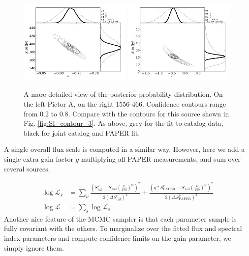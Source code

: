 \documentclass[preprint]{aastex}
\newcommand{\PAPER}{\mathrm{PAPER}}
\begin{document}
\begin{figure}[htbp]
\includegraphics[width=0.49\textwidth]{plots/pic_trace_hist.png}
\includegraphics[width=0.49\textwidth]{plots/1556-466_trace_hist.png}
\caption{
A more detailed view of the posterior probability distribution. On the left
Pictor A, on the right 1556-466. Confidence contours range from 0.2 to 0.8.
Compare with the contours for this source shown in Fig. \ref{fig:SI_contour_3}.
As above, grey for  the fit to catalog data, black for joint catalog and PAPER
fit.
}
\end{figure}


A single overall flux scale is computed in a similar way. However, here we add
a single extra gain factor $g$ multiplying all PAPER measurements, and sum over
several sources.

\begin{align}
\log\mathcal{L}_s &= \sum_{\nu}\frac{ (S_\textrm{cat}^{\nu}  - S_{150}  \left(\frac{\nu}{150}\right)^\alpha)^2}{2(\Delta S_\textrm{cat}^\nu)^2} +
\frac{ (g*S_\PAPER^{\nu}  - S_{150}\left(\frac{\nu}{150}\right)^\alpha)^2}{2(\Delta S_\PAPER^\nu)^2}\\
\log\mathcal{L} &= \sum_{s} \log\mathcal{L}_s
\end{align}
Another nice feature of the MCMC sampler is that each parameter sample is fully
covariant with the others. To marginalize over the fitted flux and spectral
index parameters and compute confidence limits on the gain parameter, we simply
ignore them.
\end{document}

